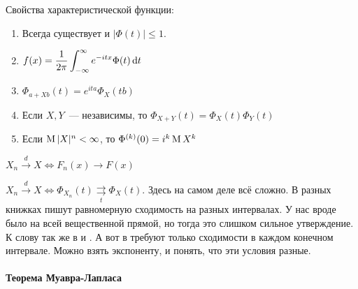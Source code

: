 \documentclass[12pt,hardcopy]{../../../notes}
\begin{document}
\begin{prop}\label{prop:prob::charfun::charfun}
  Свойства характеристической функции:
  \begin{enumerate}
    \item Всегда существует и $|\Phi(t)| \leqslant 1$.
    \item $f(x) = \dfrac{1}{2\pi} \displaystyle\int_{-\infty}^\infty e^{-itx} \Phi(t) \,\mathrm{d} t $
    \item $\Phi_{a + Xb} (t) = e^{ita} \Phi_X (tb)$
    \item Если $X,Y$~--- независимы, то $\Phi_{X+Y}(t)=  \Phi_X(t) \Phi_Y(t)$
    \item Если $\operatorname{M} |X|^n < \infty$, то $\Phi^{(k)}(0)=  i^k \operatorname{M} X^k$
  \end{enumerate}
\end{prop}
\begin{defn}\label{defn:prob::charfun::distconv}
  $X_n \xrightarrow{d} X \Leftrightarrow F_n(x) \to F(x)$ 
\end{defn}
\begin{thrm}\label{thrm:prob::charfun::contchar}
  $X_n \xrightarrow{d} X \Leftrightarrow \Phi_{X_n} (t)
  \underset{t}{\rightrightarrows} \Phi_X(t)$.
  Здесь на самом деле всё сложно. В разных книжках пишут равномерную сходимость на разных
  интервалах. У нас вроде было на всей вещественной прямой, но тогда это слишком сильное
  утверждение. К слову так же в \cite{chernova1} и \cite{shiriaev}. А вот в \cite{msu} требуют
  только сходимости в каждом конечном интервале. Можно взять экспоненту, и понять, что эти
  условия разные. 
\end{thrm}
\paragraph{Теорема Муавра-Лапласа}
\label{par:prob::laplace}
\end{document}
